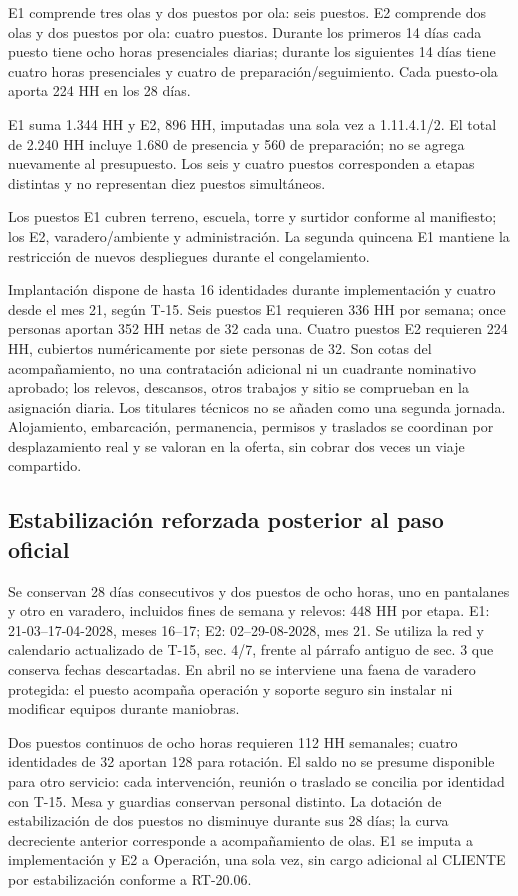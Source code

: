 E1 comprende tres olas y dos puestos por ola: seis puestos. E2 comprende dos olas y dos puestos por ola: cuatro puestos. Durante los primeros 14 días cada puesto tiene ocho horas presenciales diarias; durante los siguientes 14 días tiene cuatro horas presenciales y cuatro de preparación/seguimiento. Cada puesto-ola aporta 224 HH en los 28 días.

E1 suma 1.344 HH y E2, 896 HH, imputadas una sola vez a 1.11.4.1/2. El total de 2.240 HH incluye 1.680 de presencia y 560 de preparación; no se agrega nuevamente al presupuesto. Los seis y cuatro puestos corresponden a etapas distintas y no representan diez puestos simultáneos.

Los puestos E1 cubren terreno, escuela, torre y surtidor conforme al manifiesto; los E2, varadero/ambiente y administración. La segunda quincena E1 mantiene la restricción de nuevos despliegues durante el congelamiento.

Implantación dispone de hasta 16 identidades durante implementación y cuatro desde el mes 21, según T-15. Seis puestos E1 requieren 336 HH por semana; once personas aportan 352 HH netas de 32 cada una. Cuatro puestos E2 requieren 224 HH, cubiertos numéricamente por siete personas de 32. Son cotas del acompañamiento, no una contratación adicional ni un cuadrante nominativo aprobado; los relevos, descansos, otros trabajos y sitio se comprueban en la asignación diaria. Los titulares técnicos no se añaden como una segunda jornada. Alojamiento, embarcación, permanencia, permisos y traslados se coordinan por desplazamiento real y se valoran en la oferta, sin cobrar dos veces un viaje compartido.

\subsection{Estabilización reforzada posterior al paso oficial}
Se conservan 28 días consecutivos y dos puestos de ocho horas, uno en pantalanes y otro en varadero, incluidos fines de semana y relevos: 448 HH por etapa. E1: 21-03--17-04-2028, meses 16--17; E2: 02--29-08-2028, mes 21. Se utiliza la red y calendario actualizado de T-15, sec. 4/7, frente al párrafo antiguo de sec. 3 que conserva fechas descartadas. En abril no se interviene una faena de varadero protegida: el puesto acompaña operación y soporte seguro sin instalar ni modificar equipos durante maniobras.

Dos puestos continuos de ocho horas requieren 112 HH semanales; cuatro identidades de 32 aportan 128 para rotación. El saldo no se presume disponible para otro servicio: cada intervención, reunión o traslado se concilia por identidad con T-15. Mesa y guardias conservan personal distinto. La dotación de estabilización de dos puestos no disminuye durante sus 28 días; la curva decreciente anterior corresponde a acompañamiento de olas. E1 se imputa a implementación y E2 a Operación, una sola vez, sin cargo adicional al CLIENTE por estabilización conforme a RT-20.06.

